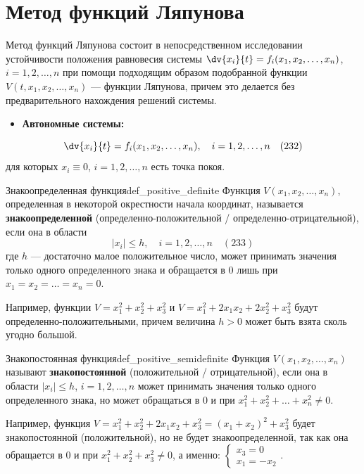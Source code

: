 \section{Метод функций Ляпунова}

Метод функций Ляпунова состоит в непосредственном исследовании устойчивости положения равновесия системы $\dv{x_i}{t} = f_i(x_1, x_2, \dots, x_n)$, $i=1,2,\dots,n$ при помощи подходящим образом подобранной функции $V(t, x_1, x_2, \dots, x_n)$ --- функции Ляпунова, причем это делается без предварительного нахождения решений системы.

\begin{itemize}
	\item \textbf{Автономные системы:}
\end{itemize}
\begin{equation} \label{eq:232}
	\dv{x_i}{t} = f_i(x_1, x_2, \dots, x_n), \quad i=1,2,\dots,n \quad (232)
\end{equation}
для которых $x_i \equiv 0$, $i=1,2,\dots,n$ есть точка покоя.

\begin{definition}{Знакоопределенная функция}{def_positive_definite}
	Функция $V(x_1, x_2, \dots, x_n)$, определенная в некоторой окрестности начала координат, называется \textbf{знакоопределенной} (определенно-положительной / определенно-отрицательной), если она в области 
	\begin{equation} \label{eq:233}
		|x_i| \le h, \quad i=1,2,\dots,n \quad (233)
	\end{equation}
	где $h$ --- достаточно малое положительное число, может принимать значения только одного определенного знака и обращается в $0$ лишь при $x_1 = x_2 = \dots = x_n = 0$.
\end{definition}

Например, функции $V = x_1^2 + x_2^2 + x_3^2$ и $V = x_1^2 + 2x_1x_2 + 2x_2^2 + x_3^2$ будут определенно-положительными, причем величина $h > 0$ может быть взята сколь угодно большой.

\begin{definition}{Знакопостоянная функция}{def_positive_semidefinite}
	Функция $V(x_1, x_2, \dots, x_n)$ называют \textbf{знакопостоянной} (положительной / отрицательной), если она в области $|x_i| \le h$, $i=1,2,\dots,n$ может принимать значения только одного определенного знака, но может обращаться в $0$ и при $x_1^2 + x_2^2 + \dots + x_n^2 \neq 0$.
\end{definition}

Например, функция $V = x_1^2 + x_2^2 + 2x_1x_2 + x_3^2 = (x_1+x_2)^2 + x_3^2$ будет знакопостоянной (положительной), но не будет знакоопределенной, так как она обращается в $0$ и при $x_1^2 + x_2^2 + x_3^2 \neq 0$, а именно:
$\begin{cases} x_3 = 0 \\ x_1 = -x_2 \end{cases}$.

